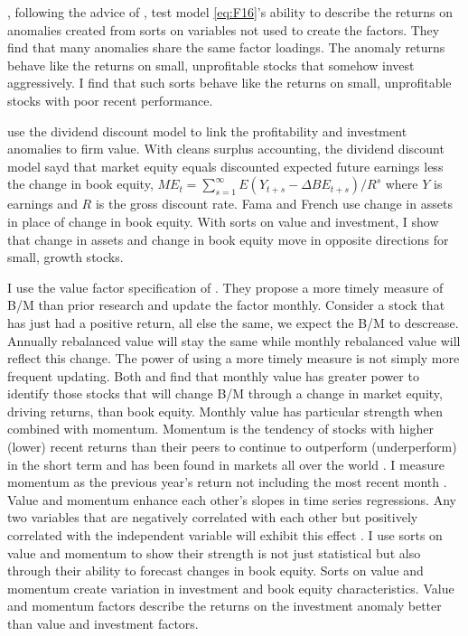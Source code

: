 \textcite{fama2016dissecting}, following the advice of
\textcite{lewellen2010skeptical}, test model \ref{eq:F16}'s ability to
describe the returns on anomalies created from sorts on variables not used to
create the factors.
They find that many anomalies share the same factor loadings.
The anomaly returns behave like the returns on small, unprofitable stocks that
somehow invest aggressively.
I find that such sorts behave like the returns on small, unprofitable stocks
with poor recent performance.

\textcite{fama2006profitability} use the dividend discount model to link the
profitability and investment anomalies to firm value.
With cleans surplus accounting, the dividend discount model sayd that market
equity equals discounted expected future earnings less the change in book
equity,
$ME_t = \sum_{s=1}^\infty E(Y_{t+s}-\Delta BE_{t+s})/R^s$
where $Y$ is earnings and $R$ is the gross discount rate.
Fama and French use change in assets in place of change in book equity.
With sorts on value and investment, I show that change in assets and change in
book equity move in opposite directions for small, growth stocks.

I use the value factor specification of \textcite{asness2013devil}.
They propose a more timely measure of B/M than prior research and update the
factor monthly.
Consider a stock that has just had a positive return, all else the same, we
expect the B/M to descrease.
Annually rebalanced value will stay the same while monthly rebalanced value
will reflect this change.
The power of using a more timely measure is not simply more frequent updating.
Both \textcite{asness2013devil} and \textcite{kok2017facts} find that monthly
value has greater power to identify those stocks that will change B/M through
a change in market equity, driving returns, than book equity.
Monthly value has particular strength when combined with momentum.
Momentum is the tendency of stocks with higher (lower) recent returns than
their peers to continue to outperform (underperform) in the short term
\parencite{jegadeesh1993returns} and has been found in markets all over the
world \parencite{asness2013value}.
I measure momentum as the previous year's return not including the most recent
month \parencite{fama2016dissecting}.
Value and momentum enhance each other's slopes in time series regressions.
Any two variables that are negatively correlated with each other but positively
correlated with the independent variable will exhibit this effect
\parencite{fama2015incremental}.
I use sorts on value and momentum to show their strength is not just
statistical but also through their ability to forecast changes in book equity.
Sorts on value and momentum create variation in investment and book equity
characteristics.
Value and momentum factors describe the returns on the investment anomaly
better than value and investment factors.

